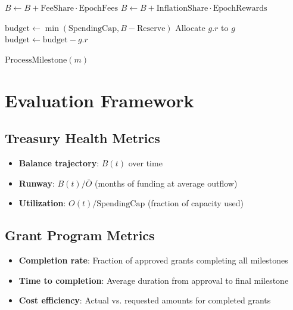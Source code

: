 \documentclass[11pt,a4paper]{article}
\begin{document}
\begin{algorithm}
\caption{Treasury Epoch Processing}
\begin{algorithmic}[1]
    \State {}
    \State $B \gets B + \text{FeeShare} \cdot \text{EpochFees}$
    \State $B \gets B + \text{InflationShare} \cdot \text{EpochRewards}$

    \State {}
    \State $\text{budget} \gets \min(\text{SpendingCap}, B - \text{Reserve})$
            \State Allocate $g.r$ to $g$
            \State $\text{budget} \gets \text{budget} - g.r$
        \EndIf
    \EndFor

    \State {}
        \State $\text{ProcessMilestone}(m)$
    \EndFor
\EndProcedure
\end{algorithmic}
\end{algorithm}

\section{Evaluation Framework}

\subsection{Treasury Health Metrics}

\begin{itemize}
    \item \textbf{Balance trajectory}: $B(t)$ over time
    \item \textbf{Runway}: $B(t) / \bar{O}$ (months of funding at average outflow)
    \item \textbf{Utilization}: $O(t) / \text{SpendingCap}$ (fraction of capacity used)
\end{itemize}

\subsection{Grant Program Metrics}

\begin{itemize}
    \item \textbf{Completion rate}: Fraction of approved grants completing all milestones
    \item \textbf{Time to completion}: Average duration from approval to final milestone
    \item \textbf{Cost efficiency}: Actual vs. requested amounts for completed grants
\end{itemize}
\end{document}
